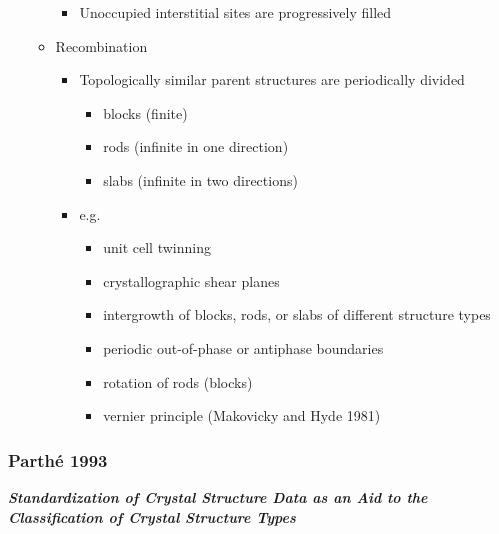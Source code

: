 \documentclass[11pt]{article}
\providecommand{\tightlist}{%
      \setlength{\itemsep}{0pt}\setlength{\parskip}{0pt}}
\begin{document}
\begin{itemize}
\begin{itemize}
    \begin{itemize}
    \tightlist
    \item
      Unoccupied interstitial sites are progressively filled
    \end{itemize}
  \item
    Recombination

    \begin{itemize}
    \tightlist
    \item
      Topologically similar parent structures are periodically divided

      \begin{itemize}
      \tightlist
      \item
        blocks (finite)
      \item
        rods (infinite in one direction)
      \item
        slabs (infinite in two directions)
      \end{itemize}
    \item
      e.g.

      \begin{itemize}
      \tightlist
      \item
        unit cell twinning
      \item
        crystallographic shear planes
      \item
        intergrowth of blocks, rods, or slabs of different structure
        types
      \item
        periodic out-of-phase or antiphase boundaries
      \item
        rotation of rods (blocks)
      \item
        vernier principle (Makovicky and Hyde 1981)
      \end{itemize}
    \end{itemize}
  \end{itemize}
\end{itemize}

    \subsubsection{Parthé 1993}\label{parthuxe9-1993}

\textbf{\emph{Standardization of Crystal Structure Data as an Aid to the
Classification of Crystal Structure Types}}
\end{document}
